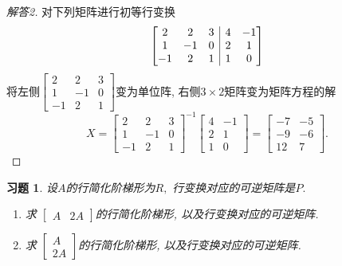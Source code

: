 \documentclass[UTF8]{ctexart}
\newenvironment{bmatriX}[1]{\left[\hskip -\arraycolsep \begin{array}{#1}}{\end{array}\hskip -\arraycolsep\right]}
\newtheorem{ex}[thm]{习题}
\begin{document}
\begin{proof}[解答2]
对下列矩阵进行初等行变换
\[
\begin{bmatriX}{ccc|cc} 2 & 2 & 3 & 4 & -1  \\ 1 & -1 & 0 & 2 & 1  \\ -1 & 2 & 1& 1 & 0  \end{bmatriX}
\]
将左侧$\begin{bmatrix} 2 & 2 & 3\\ 1 & -1 & 0 \\ -1 & 2 & 1  \end{bmatrix}$变为单位阵, 右侧$3\times 2$矩阵变为矩阵方程的解
\[
X = \begin{bmatrix} 2 & 2 & 3\\ 1 & -1 & 0 \\ -1 & 2 & 1  \end{bmatrix}^{-1}\begin{bmatrix} 4 & -1 \\ 2 & 1  \\ 1 & 0  \end{bmatrix} = \begin{bmatrix} -7 & -5 \\ -9 & -6  \\ 12 & 7  \end{bmatrix}.
\]
\end{proof}



\begin{ex}
设$A$的行简化阶梯形为$R,$ 行变换对应的可逆矩阵是$P.$
\begin{enumerate}
\item 求 $\begin{bmatrix} A & 2A  \end{bmatrix}$的行简化阶梯形, 以及行变换对应的可逆矩阵.

\item 求 $\begin{bmatrix} A \\  2A  \end{bmatrix}$的行简化阶梯形, 以及行变换对应的可逆矩阵.
\end{enumerate}
\end{ex}
\end{document}
